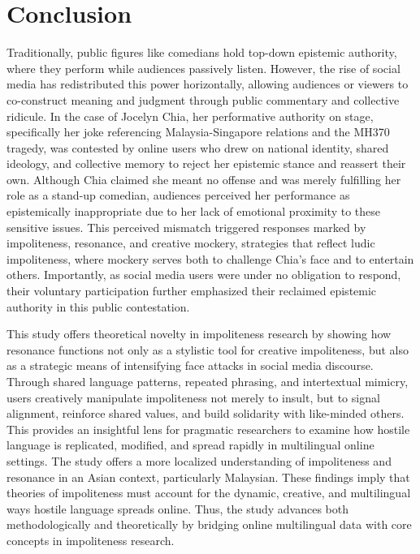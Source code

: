 \documentclass[english]{textolivre}
\begin{document}
\section{Conclusion}
Traditionally, public figures like comedians hold top-down epistemic authority, where they perform while audiences passively listen. However, the rise of social media has redistributed this power horizontally, allowing audiences or viewers to co-construct meaning and judgment through public commentary and collective ridicule. In the case of Jocelyn Chia, her performative authority on stage, specifically her joke referencing Malaysia-Singapore relations and the MH370 tragedy, was contested by online users who drew on national identity, shared ideology, and collective memory to reject her epistemic stance and reassert their own. Although Chia claimed she meant no offense and was merely fulfilling her role as a stand-up comedian, audiences perceived her performance as epistemically inappropriate due to her lack of emotional proximity to these sensitive issues. This perceived mismatch triggered responses marked by impoliteness, resonance, and creative mockery, strategies that reflect ludic impoliteness, where mockery serves both to challenge Chia’s face and to entertain others. Importantly, as social media users were under no obligation to respond, their voluntary participation further emphasized their reclaimed epistemic authority in this public contestation.

This study offers theoretical novelty in impoliteness research by showing how resonance functions not only as a stylistic tool for creative impoliteness, but also as a strategic means of intensifying face attacks in social media discourse. Through shared language patterns, repeated phrasing, and intertextual mimicry, users creatively manipulate impoliteness not merely to insult, but to signal alignment, reinforce shared values, and build solidarity with like-minded others. This provides an insightful lens for pragmatic researchers to examine how hostile language is replicated, modified, and spread rapidly in multilingual online settings. The study offers a more localized understanding of impoliteness and resonance in an Asian context, particularly Malaysian. These findings imply that theories of impoliteness must account for the dynamic, creative, and multilingual ways hostile language spreads online. Thus, the study advances both methodologically and theoretically by bridging online multilingual data with core concepts in impoliteness research. 
\end{document}
